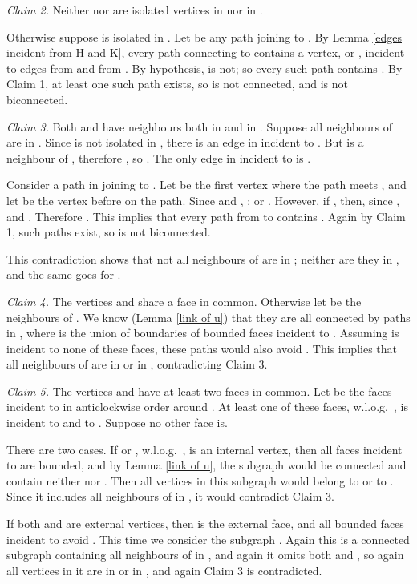 {\em Claim 2.} Neither  nor  are isolated
vertices in  nor in .

Otherwise suppose  is isolated in .
Let  be any path joining  to .
By Lemma \ref{edges incident from H and K}, every
path connecting  to 
contains a vertex,  or , incident to
edges from  and from .  By hypothesis, 
is not; so every such path contains .  By
Claim 1, at least one such path exists, so
 is not connected, and 
is not biconnected.

{\em Claim 3.}
Both  and  have neighbours both in  and
in . Suppose all neighbours of  are in .
Since  is not isolated in , there is an edge
 in  incident to .  But  is a neighbour
of , therefore , so .  The only
edge in  incident to  is .

Consider a path in 
joining  to . Let
 be the first vertex where the path meets ,
and let  be the vertex before  on the path. Since
 and , :
 or .  However, if , then, since ,
 and .  Therefore .  This
implies that every path from  to 
contains . Again by Claim 1, such paths exist, so
 is not biconnected.

This contradiction shows
that not all neighbours of  are in ; neither are
they in , and the same goes for .

{\em Claim 4.} The vertices  and  share a face in common.
Otherwise let  be the neighbours
of .  We know (Lemma \ref{link of u}) that
they are all connected by paths in ,
where  is the union of boundaries of bounded
faces incident to .  Assuming  is incident to none
of these faces, these
paths would also avoid . This implies that all neighbours
of  are in  or in , contradicting Claim 3.


{\em Claim 5.} The vertices  and  have at least two
faces in common.  Let
 be the faces incident
to  in anticlockwise order around .  At least
one of these faces, w.l.o.g.\ , is incident to  and to .
Suppose no other face is.

There are two cases.
If  or , w.l.o.g.\ , is an internal vertex, then
all faces incident to  are bounded, and by Lemma
\ref{link of u}, the subgraph
 would
be connected and contain neither  nor .  Then
all vertices in this subgraph would belong to 
or to .  Since it includes all neighbours of 
in , it would contradict Claim 3.

If both  and  are external vertices, then 
is the external face,
and all bounded faces incident to  avoid .
This time we consider the subgraph
.
Again this is
a connected subgraph containing all neighbours of 
in , and again it omits both  and , so
again all vertices in it are in  or in , and
again Claim 3 is contradicted.

